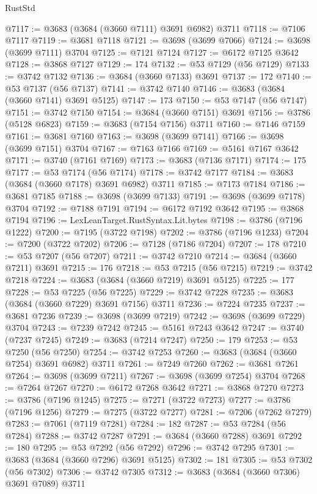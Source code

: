 \begin{lexlean}{RustStd}
\begin{coremodule}
{\begin{coremodule}
{{{{{{{{{{{{{{{{{{{{{{{{{{{{{{{{{{{{{{{{{{{{{{{@7117 := @3683 (@3684 (@3660 @7111) @3691 @6982) @3711
@7118 := @7106 @7117
@7119 := @3681 @7118
@7121 := @3698 (@3699 @7066)
@7124 := @3698 (@3699 @7111) @3704
@7125 := @7121 @7124
@7127 := @6172 @7125 @3642
@7128 := @3868 @7127
@7129 := 174
@7132 := @53 @7129 (@56 @7129)
@7133 := @3742 @7132
@7136 := @3684 (@3660 @7133) @3691
@7137 := 172
@7140 := @53 @7137 (@56 @7137)
@7141 := @3742 @7140
@7146 := @3683 (@3684 (@3660 @7141) @3691 @5125)
@7147 := 173
@7150 := @53 @7147 (@56 @7147)
@7151 := @3742 @7150
@7154 := @3684 (@3660 @7151) @3691
@7156 := @3786 (@5128 @6823)
@7159 := @3683 (@7154 @7156) @3711
@7160 := @7146 @7159
@7161 := @3681 @7160
@7163 := @3698 (@3699 @7141)
@7166 := @3698 (@3699 @7151) @3704
@7167 := @7163 @7166
@7169 := @5161 @7167 @3642
@7171 := @3740 (@7161 @7169)
@7173 := @3683 (@7136 @7171)
@7174 := 175
@7177 := @53 @7174 (@56 @7174)
@7178 := @3742 @7177
@7184 := @3683 (@3684 (@3660 @7178) @3691 @6982) @3711
@7185 := @7173 @7184
@7186 := @3681 @7185
@7188 := @3698 (@3699 @7133)
@7191 := @3698 (@3699 @7178) @3704
@7192 := @7188 @7191
@7194 := @6172 @7192 @3642
@7195 := @3868 @7194
@7196 := LexLeanTarget.RustSyntax.Lit.bytes
@7198 := @3786 (@7196 @1222)
@7200 := @7195 (@3722 @7198)
@7202 := @3786 (@7196 @1233)
@7204 := @7200 (@3722 @7202)
@7206 := @7128 (@7186 @7204)
@7207 := 178
@7210 := @53 @7207 (@56 @7207)
@7211 := @3742 @7210
@7214 := @3684 (@3660 @7211) @3691
@7215 := 176
@7218 := @53 @7215 (@56 @7215)
@7219 := @3742 @7218
@7224 := @3683 (@3684 (@3660 @7219) @3691 @5125)
@7225 := 177
@7228 := @53 @7225 (@56 @7225)
@7229 := @3742 @7228
@7235 := @3683 (@3684 (@3660 @7229) @3691 @7156) @3711
@7236 := @7224 @7235
@7237 := @3681 @7236
@7239 := @3698 (@3699 @7219)
@7242 := @3698 (@3699 @7229) @3704
@7243 := @7239 @7242
@7245 := @5161 @7243 @3642
@7247 := @3740 (@7237 @7245)
@7249 := @3683 (@7214 @7247)
@7250 := 179
@7253 := @53 @7250 (@56 @7250)
@7254 := @3742 @7253
@7260 := @3683 (@3684 (@3660 @7254) @3691 @6982) @3711
@7261 := @7249 @7260
@7262 := @3681 @7261
@7264 := @3698 (@3699 @7211)
@7267 := @3698 (@3699 @7254) @3704
@7268 := @7264 @7267
@7270 := @6172 @7268 @3642
@7271 := @3868 @7270
@7273 := @3786 (@7196 @1245)
@7275 := @7271 (@3722 @7273)
@7277 := @3786 (@7196 @1256)
@7279 := @7275 (@3722 @7277)
@7281 := @7206 (@7262 @7279)
@7283 := @7061 (@7119 @7281)
@7284 := 182
@7287 := @53 @7284 (@56 @7284)
@7288 := @3742 @7287
@7291 := @3684 (@3660 @7288) @3691
@7292 := 180
@7295 := @53 @7292 (@56 @7292)
@7296 := @3742 @7295
@7301 := @3683 (@3684 (@3660 @7296) @3691 @5125)
@7302 := 181
@7305 := @53 @7302 (@56 @7302)
@7306 := @3742 @7305
@7312 := @3683 (@3684 (@3660 @7306) @3691 @7089) @3711
}}}}}}}}}}}}}}}}}}}}}}}}}}}}}}}}}}}}}}}}}}}}}}}
\end{coremodule}}
\end{coremodule}
\end{lexlean}
